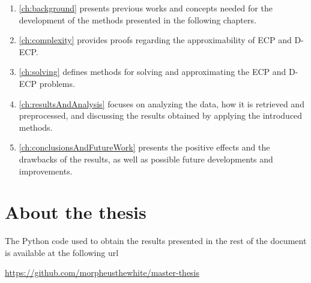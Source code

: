 \begin{enumerate}
	\item \autoref{ch:background} presents previous works and concepts
	      needed for the development of the methods presented in
	      the following chapters.
	\item \autoref{ch:complexity} provides proofs regarding the approximability
	      of \acrshort{ECP} and \acrshort{D-ECP}.
	\item \autoref{ch:solving} defines methods for solving
	      and approximating the \acrshort{ECP} and \acrshort{D-ECP} problems.
	\item \autoref{ch:resultsAndAnalysis} focuses on analyzing the
	      data, how it is retrieved and preprocessed, and discussing the results
	      obtained by applying the introduced methods.
	\item \autoref{ch:conclusionsAndFutureWork} presents the positive effects
	      and the drawbacks of the results, as well as possible future
	      developments and improvements.
\end{enumerate}

\section{About the thesis}
\label{sec:about-thesis}

The Python code used to obtain the results presented in the rest of the
document is available at the following url

\begin{center}
	\url{https://github.com/morpheusthewhite/master-thesis}
\end{center}
